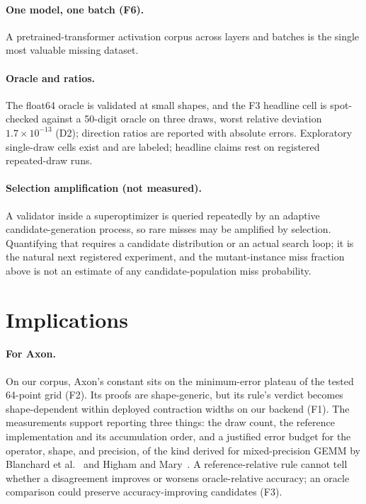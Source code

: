 \documentclass[twocolumn,10pt]{article}
\newcommand{\e}[2]{$#1\times10^{#2}$}
\begin{document}
\paragraph{One model, one batch (F6).} A pretrained-transformer
activation corpus across layers and batches is the single most valuable
missing dataset.

\paragraph{Oracle and ratios.} The float64 oracle is validated at small
shapes, and the F3 headline cell is spot-checked against a 50-digit
oracle on three draws, worst relative deviation \e{1.7}{-13} (D2);
direction ratios are reported with absolute errors. Exploratory
single-draw cells exist and are labeled; headline claims rest on
registered repeated-draw runs.

\paragraph{Selection amplification (not measured).} A validator inside a
superoptimizer is queried repeatedly by an adaptive candidate-generation
process, so rare misses may be amplified by selection. Quantifying that
requires a candidate distribution or an actual search loop; it is the
natural next registered experiment, and the mutant-instance miss
fraction above is not an estimate of any candidate-population miss
probability.

\section{Implications}

\paragraph{For Axon.} On our corpus, Axon's constant sits on the
minimum-error plateau of the tested 64-point grid (F2). Its proofs are
shape-generic, but its rule's verdict becomes shape-dependent within
deployed contraction widths on our backend (F1). The measurements
support reporting three things: the draw count, the reference
implementation and its accumulation order, and a justified error budget
for the operator, shape, and precision, of the kind derived for
mixed-precision GEMM by Blanchard et al.~\cite{blanchard} and Higham and
Mary~\cite{highammary}. A reference-relative rule cannot tell whether a
disagreement improves or worsens oracle-relative accuracy; an oracle
comparison could preserve accuracy-improving candidates (F3).
\end{document}
